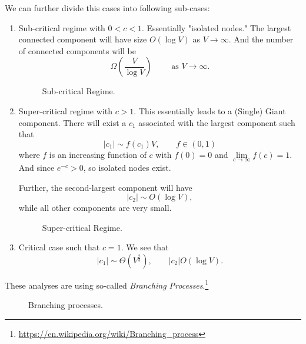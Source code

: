 \begin{enumerate}
	      We can further divide this cases into following sub-cases:
	      \begin{enumerate}
		      \item Sub-critical regime with \(0<c<1\). Essentially "isolated nodes." The largest connected component will have size \(O(\log V)\) as \(V\to \infty \). And the
		            number of connected components will be
		            \[
			            \Omega(\frac{V}{\log V}) \qquad \text{ as }V\to \infty.
		            \]
		            \begin{figure}[H]
			            \centering
			            \caption{Sub-critical Regime.}
			            \label{fig:sub-critical-regime}
		            \end{figure}
		      \item Super-critical regime with \(c>1\). This essentially leads to a (Single) Giant component. There will exist a \(c_1\) associated
		            with the largest component such that
		            \[
			            \left\vert c_1 \right\vert \sim f(c_1)V, \qquad f\in(0, 1)
		            \]
		            where \(f\) is an increasing function of \(c\) with \(f(0) = 0\) and \(\lim\limits_{c\to \infty }f(c) = 1\).
		            And since \(e^{-c}>0\), so isolated nodes exist.

		            Further, the second-largest component will have
		            \[
			            \left\vert c_2 \right\vert \sim O(\log V),
		            \]
		            while all other components are very small.
		            \begin{figure}[H]
			            \centering
			            \caption{Super-critical Regime.}
			            \label{fig:super-critical-regime}
		            \end{figure}
		      \item Critical case such that \(c = 1\). We see that
		            \[
			            \left\vert c_1 \right\vert \sim \Theta(V^{\frac{2}{3}}), \qquad \left\vert c_2 \right\vert O(\log V).
		            \]
	      \end{enumerate}
	      \begin{remark}
		      These analyses are using so-called \emph{Branching Processes}.\footnote{\url{https://en.wikipedia.org/wiki/Branching_process}}
		      \begin{figure}[H]
			      \centering
			      \caption{Branching processes.}
			      \label{fig:branching-processes}
		      \end{figure}


\end{remark}
\end{enumerate}
